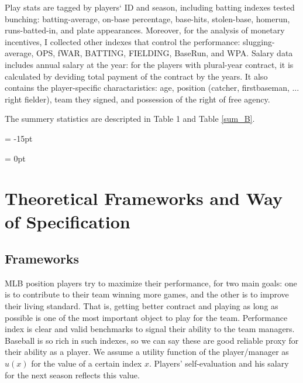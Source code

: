 \documentclass[dvipdfmx, 12pt]{article}
\begin{document}
Play stats are tagged by players` ID and season, including batting indexes tested bunching: batting-average, on-base percentage, base-hits, stolen-base, homerun, runs-batted-in, and plate appearances. Moreover,  for the analysis of monetary incentives, I collected other indexes that control the performance: slugging-average, OPS, fWAR, BATTING, FIELDING, BaseRun, and WPA. Salary data includes annual salary at the year: for the players with plural-year contract, it is calculated by deviding total payment of the contract by the years. It also contains the player-specific charactaristics: age, position (catcher, firstbaseman, ... right fielder), team they signed, and possession of the right of free agency.

The summery statistics are descripted in Table 1 and Table \ref{sum_B}.

\begin{table}
  
\end{table}

\leftskip = -15pt
\begin{table}
  
\end{table}
\leftskip = 0pt

\section{Theoretical Frameworks and Way of Specification}

\subsection{Frameworks}

MLB position players try to maximize their performance, for two main goals: one is to contribute to their team winning more games, and the other is to improve their living standard. That is, getting better contract and playing as long as possible is one of the most important object to play for the team. Performance index is clear and valid benchmarks to signal their ability to the team managers. Baseball is so rich in such indexes, so we can say these are good reliable proxy for their ability as a player. We assume a utility function of the player/manager as $u(x)$ for the value of a certain index $x$. Players' self-evaluation and his salary for the next season reflects this value.
\end{document}

